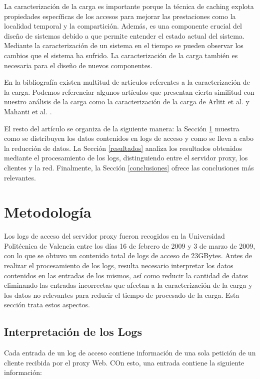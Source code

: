 \documentclass[twocolumn]{Jornadas}
\begin{document}
La caracterización de la carga es importante porque la técnica de caching explota propiedades específicas de los accesos para mejorar las prestaciones como la localidad temporal y la compartición. Además, es una componente crucial del diseño de sistemas debido a que permite entender el estado actual del sistema. Mediante la caracterización de un sistema en el tiempo se pueden observar los cambios que el sistema ha sufrido. La caracterización de la carga también es necesaria para el diseño de nuevos componentes.

En la bibliografía existen multitud de artículos referentes a la caracterización de la carga. Podemos referenciar algunos artículos que presentan cierta similitud con nuestro análisis de la carga como la caracterización de la carga de Arlitt et al. \cite{arlitt} y Mahanti et al. \cite{mahanti}.

El resto del artículo se organiza de la siguiente manera: la
Sección \ref{meto} muestra como se distribuyen los datos contenidos en logs de acceso y como se lleva a cabo la reducción de datos. La Sección \ref{resultados} analiza los resultados
obtenidos mediante el procesamiento de los logs, distinguiendo entre el servidor proxy, los clientes y la red. Finalmente, la Sección \ref{conclusiones} ofrece las conclusiones más relevantes.

\section{Metodología}
\label{meto}

Los logs de acceso del servidor proxy fueron recogidos en la Universidad Politécnica de Valencia entre los días 16 de febrero de 2009 y 3 de marzo de 2009, con lo que se obtuvo un contenido total de logs de acceso de 23GBytes. Antes de realizar el procesamiento de los logs, resulta necesario interpretar los datos contenidos en las entradas de los mismos, así como reducir la cantidad de datos eliminando las entradas incorrectas que afectan a la caracterización de la carga y los datos no relevantes para reducir el tiempo de procesado de la carga. Esta sección trata estos aspectos.

\subsection{Interpretación de los Logs}

Cada entrada de un log de acceso contiene información de una sola petición de un cliente recibida por el proxy Web. COn esto, una entrada contiene la siguiente información:
\end{document}
